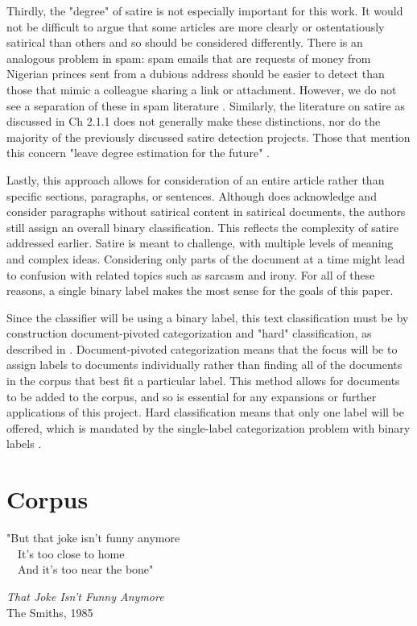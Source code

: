 \documentclass [12 pt] {report}
\begin{document}
Thirdly, the "degree" of satire is not especially important for this work. It would not be difficult to argue that some articles are more clearly or ostentatiously satirical than others and so should be considered differently. There is an analogous problem in spam: spam emails that are requests of money from Nigerian princes sent from a dubious address should be easier to detect than those that mimic a colleague sharing a  link or attachment. However, we do not see a separation of these in spam literature \cite{Blanzieri} \cite{Zhang}. Similarly, the literature on satire as discussed in Ch 2.1.1 does not generally make these distinctions, nor do the majority of the previously discussed satire detection projects. Those that mention this concern "leave degree estimation for the future" \cite{Yang}.

Lastly, this approach allows for consideration of an entire article rather than specific sections, paragraphs, or sentences. Although \cite{Yang} does acknowledge and consider paragraphs without satirical content in satirical documents, the authors still assign an overall binary classification. This reflects the complexity of satire addressed earlier. Satire is meant to challenge, with multiple levels of meaning and complex ideas. Considering only parts of the document at a time might lead to confusion with related topics such as sarcasm and irony. For all of these reasons, a single binary label makes the most sense for the goals of this paper.

Since the classifier will be using a binary label, this text classification must be by construction document-pivoted categorization and "hard" classification, as described in \cite{Sebastiani}. Document-pivoted categorization means that the focus will be to assign labels to documents individually rather than finding all of the documents in the corpus that best fit a particular label. This method allows for documents to be added to the corpus, and so is essential for any expansions or further applications of this project. Hard classification means that only one label will be offered, which is mandated by the single-label categorization problem with binary labels \cite{Sebastiani}.

\chapter{Corpus}
\singlespacing
\epigraph{"But that joke isn't funny anymore\\~~It's too close to home\\~~And it's too near the bone"}{\textit{That Joke Isn't Funny Anymore}\\ The Smiths, 1985}
\onehalfspacing
\end{document}
